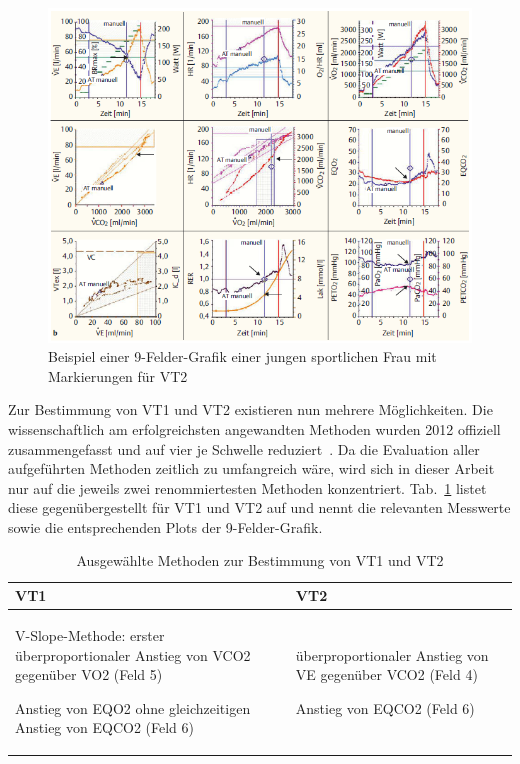 \begin{figure}[H]
	\centering
	\includegraphics[width=135mm]{Bilder/9fieldplot.png}
	\caption[Beispielhafte 9-Felder-Grafik mit Markierungen für VT2]{Beispiel einer 9-Felder-Grafik einer jungen sportlichen Frau mit Markierungen für VT2~\cite{Kroidl.2015}}
	\label{pic:pic3}
\end{figure}
%
Zur Bestimmung von VT1 und VT2 existieren nun mehrere Möglichkeiten. Die wissenschaftlich am erfolgreichsten angewandten Methoden wurden 2012 offiziell zusammengefasst und auf vier je Schwelle reduziert~\cite{Westhoff.2012}. Da die Evaluation aller aufgeführten Methoden zeitlich zu umfangreich wäre, wird sich in dieser Arbeit nur auf die jeweils zwei renommiertesten Methoden konzentriert. Tab.~\ref{tab:tabelle2} listet diese gegenübergestellt für VT1 und VT2 auf und nennt die relevanten Messwerte sowie die entsprechenden Plots der 9-Felder-Grafik.

\begin{table}[H]
	\centering
	\caption{Ausgewählte Methoden zur Bestimmung von VT1 und VT2}
	\medskip
	\begin{tabularx}{\textwidth}{X X}
		\toprule
		\textbf{VT1} & \textbf{VT2} \\
		\midrule
		\midrule
		\begin{titemize}
			\item V-Slope-Methode: erster überproportionaler Anstieg von \acs{VCO2} gegenüber \acs{VO2} (Feld 5)
			\item Anstieg von \ac{EQO2} ohne gleichzeitigen Anstieg von \ac{EQCO2} (Feld 6)
		\end{titemize}
		&\begin{titemize}
			\item überproportionaler Anstieg von \acs{VE} gegenüber \acs{VCO2} (Feld 4)
			\item Anstieg von \ac{EQCO2} (Feld 6)
		\end{titemize}\\
		\bottomrule
	\end{tabularx}
	\label{tab:tabelle2}
\end{table}

